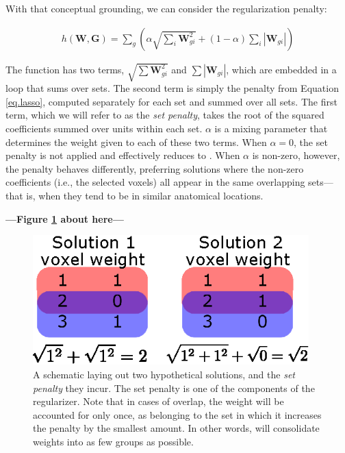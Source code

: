 With that conceptual grounding, we can consider the {\soslasso} regularization penalty:

\begin{align}
h(\mathbf{W},\mathbf{G}) = \sum_{g}\left(  \alpha \sqrt{\sum_{i} \mathbf{W}_{gi}^2} + (1-\alpha) \sum_{i} |\mathbf{W}_{gi}| \right) 
\end{align}

The function has two terms, $\sqrt{\sum{\mathbf{W}^2_{gi}}}$ and $\sum{|\mathbf{W}_{gi}|}$, which are embedded in a loop that sums over sets. The second term is simply the {\lasso} penalty from Equation \ref{eq.lasso}, computed separately for each set and summed over all sets. The first term, which we will refer to as the {\em set penalty}, takes the root of the squared coefficients summed over units within each set. $\alpha$ is a mixing parameter that determines the weight given to each of these two terms. When $\alpha=0$, the set penalty is not applied and {\soslasso} effectively reduces to {\lasso}. When $\alpha$ is non-zero, however, the penalty behaves differently, preferring solutions where the non-zero coefficients (i.e., the selected voxels) all appear in the same overlapping sets---that is, when they tend to be in similar anatomical locations.

\begin{center}
	\textbf{---Figure \ref{fig.soslossex} about here---}
\end{center}

\begin{figure}
	\centering
	\includegraphics[width=0.95\textwidth]{figures/soslasso_loss_example.eps}
	\caption{A schematic laying out two hypothetical solutions, and the {\em set penalty} they incur. The set penalty is one of the components of the {\soslasso} regularizer. Note that in cases of overlap, the weight will be accounted for only once, as belonging to the set in which it increases the penalty by the smallest amount. In other words, {\soslasso} will consolidate weights into as few groups as possible.}
	\label{fig.soslossex} 
\end{figure}

